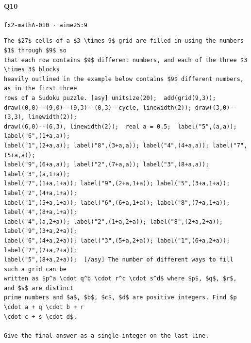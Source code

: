 \documentclass[10pt]{article}
\begin{document}
\paragraph{Q10} \texttt{fx2-mathA-010  ·  aime25:9}
\begin{verbatim}
The $27$ cells of a $3 \times 9$ grid are filled in using the numbers $1$ through $9$ so
that each row contains $9$ different numbers, and each of the three $3 \times 3$ blocks
heavily outlined in the example below contains $9$ different numbers, as in the first three
rows of a Sudoku puzzle. [asy] unitsize(20);  add(grid(9,3));
draw((0,0)--(9,0)--(9,3)--(0,3)--cycle, linewidth(2)); draw((3,0)--(3,3), linewidth(2));
draw((6,0)--(6,3), linewidth(2));  real a = 0.5;  label("5",(a,a)); label("6",(1+a,a));
label("1",(2+a,a)); label("8",(3+a,a)); label("4",(4+a,a)); label("7",(5+a,a));
label("9",(6+a,a)); label("2",(7+a,a)); label("3",(8+a,a));  label("3",(a,1+a));
label("7",(1+a,1+a)); label("9",(2+a,1+a)); label("5",(3+a,1+a)); label("2",(4+a,1+a));
label("1",(5+a,1+a)); label("6",(6+a,1+a)); label("8",(7+a,1+a)); label("4",(8+a,1+a));
label("4",(a,2+a)); label("2",(1+a,2+a)); label("8",(2+a,2+a)); label("9",(3+a,2+a));
label("6",(4+a,2+a)); label("3",(5+a,2+a)); label("1",(6+a,2+a)); label("7",(7+a,2+a));
label("5",(8+a,2+a));  [/asy] The number of different ways to fill such a grid can be
written as $p^a \cdot q^b \cdot r^c \cdot s^d$ where $p$, $q$, $r$, and $s$ are distinct
prime numbers and $a$, $b$, $c$, $d$ are positive integers. Find $p \cdot a + q \cdot b + r
\cdot c + s \cdot d$.

Give the final answer as a single integer on the last line.
\end{verbatim}
\end{document}
